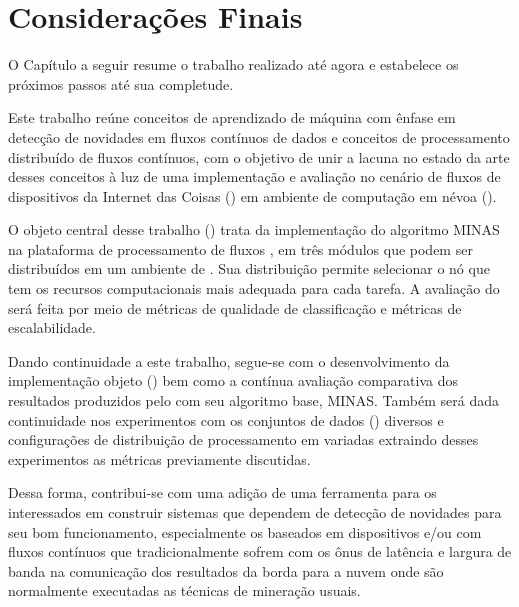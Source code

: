 \chapter{Considerações Finais}\label{cha:final}

\begin{resumocap}
  O Capítulo a seguir resume o trabalho realizado até agora e estabelece
  os próximos passos até sua completude.
\end{resumocap}

Este trabalho reúne conceitos de aprendizado de máquina com ênfase em detecção
de novidades em fluxos contínuos de dados e conceitos de processamento
distribuído de fluxos contínuos, com o objetivo de unir a lacuna no estado da
arte desses conceitos à luz de uma implementação e avaliação no cenário de
fluxos de dispositivos da Internet das Coisas (\iot) em ambiente de computação
em névoa (\fog).

O objeto central desse trabalho (\mfog) trata da implementação do algoritmo MINAS na
plataforma de processamento de fluxos \flink, em três módulos que podem ser
distribuídos em um ambiente de \fog.
Sua distribuição permite selecionar o nó que tem os recursos computacionais mais
adequada para cada tarefa.
A avaliação do \mfog será feita por meio de métricas de qualidade de classificação
e métricas de escalabilidade.


Dando continuidade a este trabalho, segue-se com o desenvolvimento da implementação objeto
(\mfog) bem como a contínua avaliação comparativa dos resultados
produzidos pelo \mfog com seu algoritmo base, MINAS.
Também será dada continuidade nos experimentos com os conjuntos de dados (\datasets)
diversos e configurações de distribuição de processamento em \fog variadas
extraindo desses experimentos as métricas previamente discutidas.




Dessa forma, contribui-se com uma adição de uma ferramenta para os interessados
em construir sistemas que dependem de detecção de novidades para seu bom
funcionamento, especialmente os baseados em dispositivos \iot e/ou com fluxos
contínuos que tradicionalmente sofrem com os ônus de latência e largura de banda
na comunicação dos resultados da borda para a nuvem onde são normalmente
executadas as técnicas de mineração usuais.


